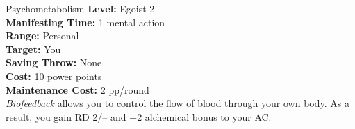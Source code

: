 {Psychometabolism}
{
	\textbf{Level:}
	Egoist 2\\
	\textbf{Manifesting Time:}
	1 mental action\\
	\textbf{Range:}
	Personal\\
	\textbf{Target:}
	You\\
	\textbf{Saving Throw:}
	None\\
	\textbf{Cost:}
	10 power points\\
	\textbf{Maintenance Cost:}
	2 pp/round\\
}
{
	\emph{Biofeedback} allows you to control the flow of blood through your own body. As a result, you gain RD 2/-- and +2 alchemical bonus to your AC.
}